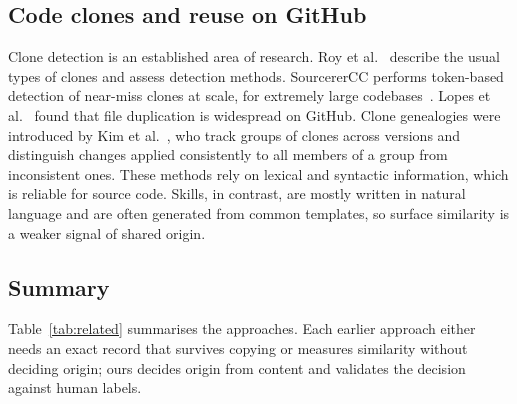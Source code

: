 \documentclass[sigconf,screen]{acmart}
\begin{document}
\subsection{Code clones and reuse on GitHub}

Clone detection is an established area of research. Roy et al.~\cite{roy2009comparison} describe the usual types of clones and assess detection methods. SourcererCC performs token-based detection of near-miss clones at scale, for extremely large codebases~\cite{sajnani2016sourcerercc}. Lopes et al.~\cite{lopes2017dejavu} found that file duplication is widespread on GitHub. Clone genealogies were introduced by Kim et al.~\cite{kim2005genealogy}, who track groups of clones across versions and distinguish changes applied consistently to all members of a group from inconsistent ones. These methods rely on lexical and syntactic information, which is reliable for source code. Skills, in contrast, are mostly written in natural language and are often generated from common templates, so surface similarity is a weaker signal of shared origin.

\subsection{Summary}

Table~\ref{tab:related} summarises the approaches. Each earlier approach either needs an exact record that survives copying or measures similarity without deciding origin; ours decides origin from content and validates the decision against human labels.
\end{document}
